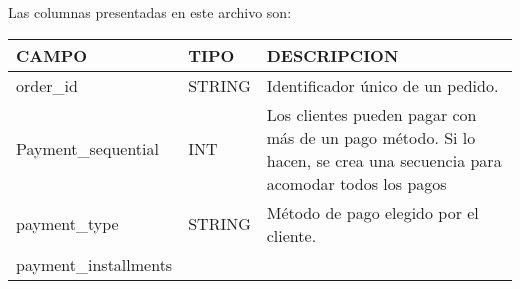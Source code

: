 \documentclass[11pt]{article}
\begin{document}
Las columnas presentadas en este archivo son:

\begin{longtable}[]{@{}lll@{}}
\toprule
\begin{minipage}[b]{0.30\columnwidth}\raggedright
CAMPO\strut
\end{minipage} & \begin{minipage}[b]{0.30\columnwidth}\raggedright
TIPO\strut
\end{minipage} & \begin{minipage}[b]{0.30\columnwidth}\raggedright
DESCRIPCION\strut
\end{minipage}\tabularnewline
\midrule
\endhead
\begin{minipage}[t]{0.30\columnwidth}\raggedright
order\_id\strut
\end{minipage} & \begin{minipage}[t]{0.30\columnwidth}\raggedright
STRING\strut
\end{minipage} & \begin{minipage}[t]{0.30\columnwidth}\raggedright
Identificador único de un pedido.\strut
\end{minipage}\tabularnewline
\begin{minipage}[t]{0.30\columnwidth}\raggedright
Payment\_sequential\strut
\end{minipage} & \begin{minipage}[t]{0.30\columnwidth}\raggedright
INT\strut
\end{minipage} & \begin{minipage}[t]{0.30\columnwidth}\raggedright
Los clientes pueden pagar con más de un pago método. Si lo hacen, se
crea una secuencia para acomodar todos los pagos\strut
\end{minipage}\tabularnewline
\begin{minipage}[t]{0.30\columnwidth}\raggedright
payment\_type\strut
\end{minipage} & \begin{minipage}[t]{0.30\columnwidth}\raggedright
STRING\strut
\end{minipage} & \begin{minipage}[t]{0.30\columnwidth}\raggedright
Método de pago elegido por el cliente.\strut
\end{minipage}\tabularnewline
\begin{minipage}[t]{0.30\columnwidth}\raggedright
payment\_installments\strut
\end{minipage} & \begin{minipage}[t]{0.30\columnwidth}\raggedright

\end{minipage}
\end{longtable}
\end{document}
